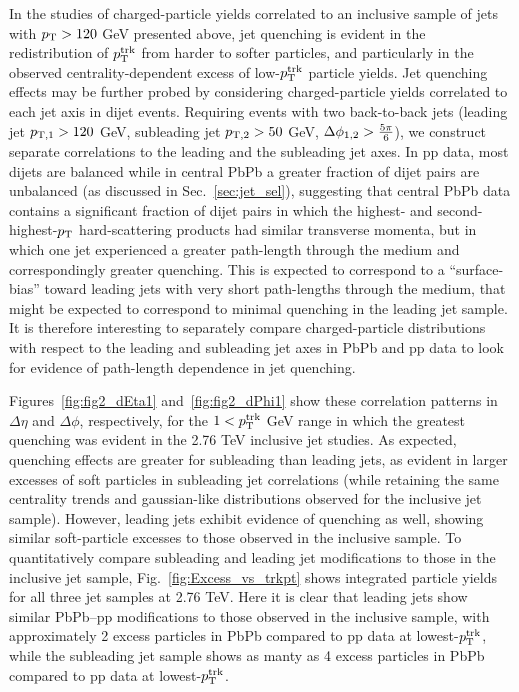 In the studies of charged-particle yields correlated to an inclusive sample of jets with $p_{\rm T} > 120$ GeV presented above, jet quenching is evident in the redistribution of $p_{\rm T}^{\rm trk}$ from harder to softer particles, and particularly in the observed centrality-dependent excess of low-$p_{\rm T}^{\rm trk}$ particle yields.  Jet quenching effects may be further probed by considering charged-particle yields correlated to each jet axis in dijet events.  Requiring events with two back-to-back jets (leading jet $p_{\rm T,1} > 120$ GeV, subleading jet $p_{\rm T,2} > 50$ GeV, $\Delta\phi_{\rm 1,2} > \frac{5\pi}{6}$), we construct separate correlations to the leading and the subleading jet axes.  In pp data, most dijets are balanced while in central PbPb a greater fraction of dijet pairs are unbalanced (as discussed in Sec.~\ref{sec:jet_sel}), suggesting that central PbPb data contains a significant fraction of dijet pairs in which the highest- and second-highest-$p_{\rm T}$ hard-scattering products had similar transverse momenta, but in which one jet experienced a greater path-length through the medium and correspondingly greater quenching.  This is expected to correspond to a ``surface-bias'' toward leading jets with very short path-lengths through the medium, that might be expected to correspond to minimal quenching in the leading jet sample.  It is therefore interesting to separately compare charged-particle distributions with respect to the leading and subleading jet axes in PbPb and pp data to look for evidence of path-length dependence in jet quenching.  

Figures~\ref{fig:fig2_dEta1} and~\ref{fig:fig2_dPhi1} show these correlation patterns in $\Delta\eta$ and $\Delta\phi$, respectively, for the $1 < p_{\rm T}^{\rm trk}$ GeV range in which the greatest quenching was evident in the 2.76 TeV inclusive jet studies.  As expected, quenching effects are greater for subleading than leading jets, as evident in larger excesses of soft particles in subleading jet correlations (while retaining the same centrality trends and gaussian-like distributions observed for the inclusive jet sample).  However, leading jets exhibit evidence of quenching as well, showing similar soft-particle excesses to those observed in the inclusive sample.  To quantitatively compare subleading and leading jet modifications to those in the inclusive jet sample, Fig.~\ref{fig:Excess_vs_trkpt} shows integrated particle yields for all three jet samples at 2.76 TeV.  Here it is clear that leading jets show similar PbPb--pp modifications to those observed in the inclusive sample, with approximately 2 excess particles in PbPb compared to pp data at lowest-$p_{\rm T}^{\rm trk}$, while the subleading jet sample shows as manty as 4 excess particles in PbPb compared to pp data at lowest-$p_{\rm T}^{\rm trk}$.

